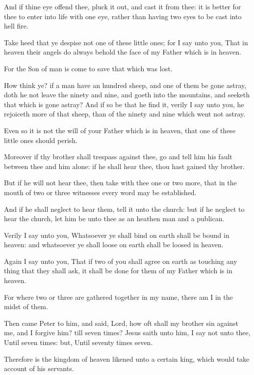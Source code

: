 \verse And if thine eye offend thee, pluck it out, and cast it from thee: it is better for thee to enter into life with one eye, rather than having two eyes to be cast into hell fire.

\verse Take heed that ye despise not one of these little ones; for I say unto you, That in heaven their angels do always behold the face of my Father which is in heaven.

\verse For the Son of man is come to save that which was lost.

\verse How think ye? if a man have an hundred sheep, and one of them be gone astray, doth he not leave the ninety and nine, and goeth into the mountains, and seeketh that which is gone astray?  \verse And if so be that he find it, verily I say unto you, he rejoiceth more of that sheep, than of the ninety and nine which went not astray.

\verse Even so it is not the will of your Father which is in heaven, that one of these little ones should perish.

\verse Moreover if thy brother shall trespass against thee, go and tell him his fault between thee and him alone: if he shall hear thee, thou hast gained thy brother.

\verse But if he will not hear thee, then take with thee one or two more, that in the mouth of two or three witnesses every word may be established.

\verse And if he shall neglect to hear them, tell it unto the church: but if he neglect to hear the church, let him be unto thee as an heathen man and a publican.

\verse Verily I say unto you, Whatsoever ye shall bind on earth shall be bound in heaven: and whatsoever ye shall loose on earth shall be loosed in heaven.

\verse Again I say unto you, That if two of you shall agree on earth as touching any thing that they shall ask, it shall be done for them of my Father which is in heaven.

\verse For where two or three are gathered together in my name, there am I in the midst of them.

\verse Then came Peter to him, and said, Lord, how oft shall my brother sin against me, and I forgive him? till seven times?  \verse Jesus saith unto him, I say not unto thee, Until seven times: but, Until seventy times seven.

\verse Therefore is the kingdom of heaven likened unto a certain king, which would take account of his servants.

